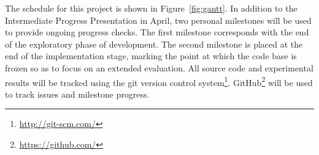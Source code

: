 The schedule for this project is shown in Figure~\ref{fig:gantt}. In
addition to the Intermediate Progress Presentation in April, two
personal milestones will be used to provide ongoing progress
checks. The first milestone corresponds with the end of the
exploratory phase of development. The second milestone is placed at
the end of the implementation stage, marking the point at which the
code base is frozen so as to focus on an extended evaluation. All
source code and experimental results will be tracked using the git
version control system\footnote{\url{http://git-scm.com/}}.
GitHub\footnote{\url{https://github.com/}} will be used to track
issues and milestone progress.

\begin{figure*}[t]
\makebox[\textwidth][c]{}
\caption{Project schedule Gantt chart.}
\label{fig:gantt}
\end{figure*}
